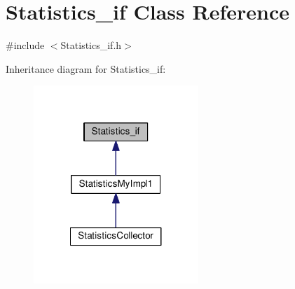 \hypertarget{class_statistics__if}{\section{Statistics\-\_\-if Class Reference}
\label{class_statistics__if}
}


{\ttfamily \#include $<$Statistics\-\_\-if.\-h$>$}



Inheritance diagram for Statistics\-\_\-if\-:
\nopagebreak
\begin{figure}[H]
\begin{center}
\leavevmode
\includegraphics[width=176pt]{class_statistics__if__inherit__graph}
\end{center}
\end{figure}
